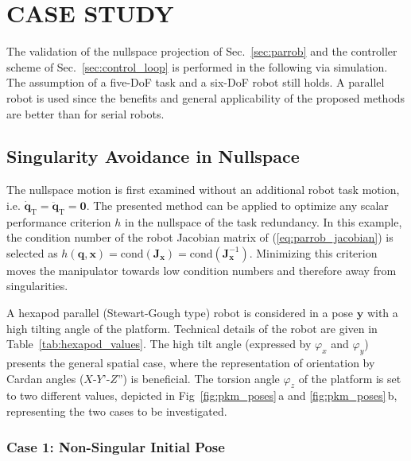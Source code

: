\documentclass[a4paper,twoside]{article}
\begin{document}
\section{\uppercase{Case Study}}
\label{sec:casestudy}





The validation of the nullspace projection of Sec.~\ref{sec:parrob} and the controller scheme of Sec.~\ref{sec:control_loop} is performed in the following via simulation.
The assumption of a five-DoF task and a six-DoF robot still holds.
A parallel robot is used since the benefits and general applicability of the proposed methods are better than for serial robots.

\subsection{Singularity Avoidance in Nullspace}
\label{sec:casestudy_nullspace}

The nullspace motion is first examined without an additional robot task motion, i.e. $\dot{\bm{q}}_\mathrm{T}=\ddot{\bm{q}}_\mathrm{T}=\bm{0}$.
The presented method can be applied to optimize any scalar performance criterion $h$ in the nullspace of the task redundancy.
In this example, the condition number of the robot Jacobian matrix of (\ref{eq:parrob_jacobian}) is selected as $h(\bm{q},\bm{x})=\mathrm{cond}(\bm{J}_{\bm{x}})=\mathrm{cond}(\bm{J}_{\bm{x}}^{-1})$.
Minimizing this criterion moves the manipulator towards low condition numbers and therefore away from singularities.

A hexapod parallel (Stewart-Gough type) robot is considered in a pose $\bm{y}$ with a high tilting angle of the platform.
Technical details of the robot are given in Table~\ref{tab:hexapod_values}.
The high tilt angle (expressed by $\varphi_x$ and $\varphi_y$) presents the general spatial case, where the representation of orientation by Cardan angles ($X$-$Y$'-$Z$'') is beneficial.
The torsion angle $\varphi_z$ of the platform is set to two different values, depicted in Fig~\ref{fig:pkm_poses}\,a and \ref{fig:pkm_poses}\,b, representing the two cases to be investigated.

\subsubsection{Case 1: Non-Singular Initial Pose}
\label{sec:eval_case1}
\end{document}
